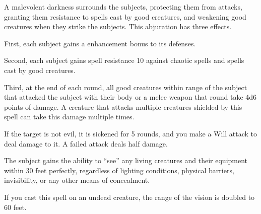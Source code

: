 \begin{comment}
\subsubsection{U-Z}
\end{comment}

\begin{spelleffect}
  A malevolent darkness surrounds the subjects, protecting them from attacks, granting them resistance to spells cast by good creatures, and weakening good creatures when they strike the subjects. This abjuration has three effects.
  \par First, each subject gains a  enhancement bonus to its defenses.
  \par Second, each subject gains spell resistance 10 against chaotic spells and spells cast by good creatures.
  \par Third, at the end of each round, all good creatures within \rngclose range of the subject that attacked the subject with their body or a melee weapon that round take 4d6 points of damage. A creature that attacks multiple creatures shielded by this spell can take this damage multiple times.
\end{spelleffect}

\spellrng{\rngmed}
\begin{spelleffect}
    If the target is not evil, it is sickened for 5 rounds, and you make a Will attack to deal damage to it. A failed attack deals half damage.
\end{spelleffect}

\begin{spelleffect}
  The subject gains the ability to ``see'' any living creatures and their equipment within 30 feet perfectly, regardless of lighting conditions, physical barriers, invisibility, or any other means of concealment.

  If you cast this spell on an undead creature, the range of the vision is doubled to 60 feet.
\end{spelleffect}

